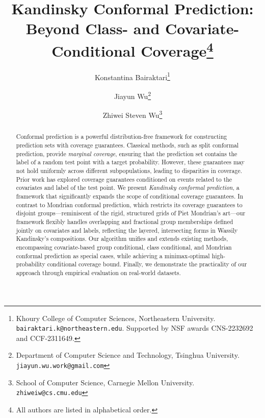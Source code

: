\documentclass{article}
\title{Kandinsky Conformal Prediction: \\
Beyond Class- and Covariate-Conditional Coverage\thanks{All authors are listed in alphabetical order.}}
\author{Konstantina Bairaktari\thanks{Khoury College of Computer Sciences, Northeastern University. \texttt{bairaktari.k@northeastern.edu}. Supported by NSF awards CNS-2232692 and CCF-2311649.}
        \and
        Jiayun Wu\thanks{Department of Computer Science and Technology,
        Tsinghua University.
        \texttt{jiayun.wu.work@gmail.com}} 
        \and
        Zhiwei Steven Wu\thanks{School of Computer Science,
        Carnegie Mellon University.
        \texttt{zhiweiw@cs.cmu.edu}} 
}
\date{}
\begin{document}
\maketitle

\begin{abstract}
Conformal prediction is a powerful distribution-free framework for constructing prediction sets with coverage guarantees. Classical methods, such as split conformal prediction, provide \emph{marginal coverage}, ensuring that the prediction set contains the label of a random test point with a target probability. However, these guarantees may not hold uniformly across different subpopulations, leading to disparities in coverage. Prior work has explored coverage guarantees conditioned on events related to the covariates and label of the test point. 
We present \emph{Kandinsky conformal prediction}, a framework that significantly expands the scope of conditional coverage guarantees. In contrast to Mondrian conformal prediction, which restricts its coverage guarantees to disjoint groups—reminiscent of the rigid, structured grids of Piet Mondrian’s art—our framework flexibly handles overlapping and fractional group memberships defined jointly on covariates and labels, reflecting the layered, intersecting forms in Wassily Kandinsky’s compositions. Our algorithm unifies and extends existing methods, encompassing covariate-based group conditional, class conditional, and Mondrian conformal prediction as special cases, while achieving a minimax-optimal high-probability conditional coverage bound.  Finally, we demonstrate the practicality of our approach through empirical evaluation on real-world datasets.


\end{abstract}
\end{document}
